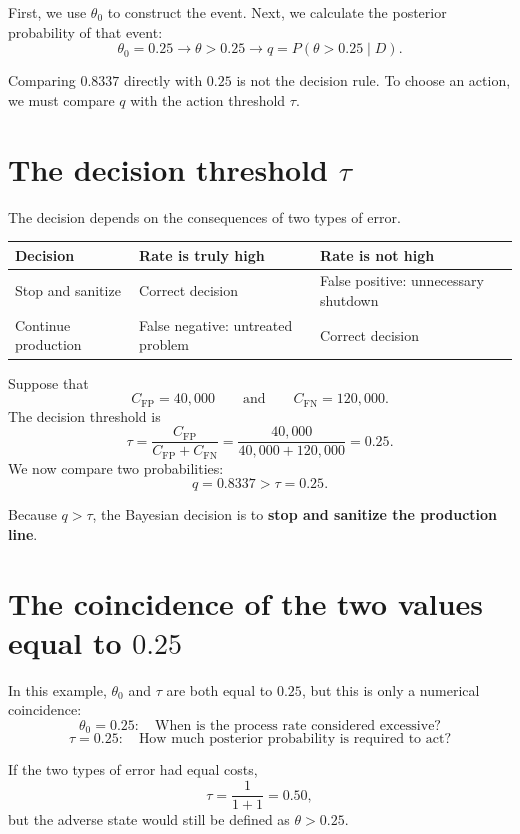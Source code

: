 \documentclass[11pt,letter]{article}
\newcommand{\CFP}{C_{\mathrm{FP}}}
\newcommand{\CFN}{C_{\mathrm{FN}}}
\begin{document}
First, we use $\theta_0$ to construct the event. Next, we calculate the
posterior probability of that event:
\[
\theta_0=0.25
\longrightarrow
\theta>0.25
\longrightarrow
q=P(\theta>0.25\mid D).
\]

\begin{atencao}
Comparing $0.8337$ directly with $0.25$ is not the decision rule. To choose an
action, we must compare $q$ with the action threshold $\tau$.
\end{atencao}
\section{The decision threshold $\tau$}

The decision depends on the consequences of two types of error.

\begin{center}
\begin{tabular}{p{3.8cm}p{4.8cm}p{4.8cm}}
\toprule
Decision & Rate is truly high & Rate is not high \\
\midrule
Stop and sanitize
& Correct decision
& False positive: unnecessary shutdown \\
Continue production
& False negative: untreated problem
& Correct decision \\
\bottomrule
\end{tabular}
\end{center}

Suppose that
\[
\CFP=40{,}000
\qquad\text{and}\qquad
\CFN=120{,}000.
\]
The decision threshold is
\[
\tau
=\frac{\CFP}{\CFP+\CFN}
=\frac{40{,}000}{40{,}000+120{,}000}
=0.25.
\]
We now compare two probabilities:
\[
q=0.8337>\tau=0.25.
\]

\begin{ideia}
Because $q>\tau$, the Bayesian decision is to \textbf{stop and sanitize the
production line}.
\end{ideia}

\section{The coincidence of the two values equal to $0.25$}

In this example, $\theta_0$ and $\tau$ are both equal to $0.25$, but this is
only a numerical coincidence:
\[
\theta_0=0.25:
\quad
\text{When is the process rate considered excessive?}
\]
\[
\tau=0.25:
\quad
\text{How much posterior probability is required to act?}
\]

If the two types of error had equal costs,
\[
\tau=\frac{1}{1+1}=0.50,
\]
but the adverse state would still be defined as $\theta>0.25$.
\end{document}
